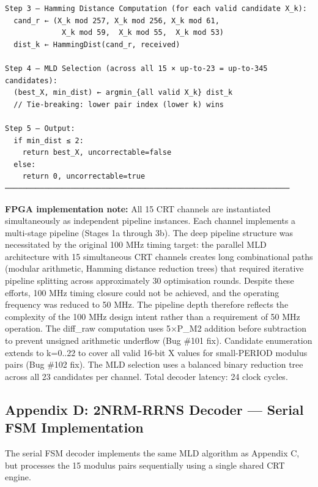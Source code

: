 \begin{verbatim}
Step 3 — Hamming Distance Computation (for each valid candidate X_k):
  cand_r ← (X_k mod 257, X_k mod 256, X_k mod 61,
             X_k mod 59,  X_k mod 55,  X_k mod 53)
  dist_k ← HammingDist(cand_r, received)

Step 4 — MLD Selection (across all 15 × up-to-23 = up-to-345 candidates):
  (best_X, min_dist) ← argmin_{all valid X_k} dist_k
  // Tie-breaking: lower pair index (lower k) wins

Step 5 — Output:
  if min_dist ≤ 2:
    return best_X, uncorrectable=false
  else:
    return 0, uncorrectable=true
─────────────────────────────────────────────────────────────────
\end{verbatim}

\textbf{FPGA implementation note:} All 15 CRT channels are instantiated
simultaneously as independent pipeline instances. Each channel
implements a multi-stage pipeline (Stages 1a through 3b). The deep
pipeline structure was necessitated by the original 100 MHz timing
target: the parallel MLD architecture with 15 simultaneous CRT channels
creates long combinational paths (modular arithmetic, Hamming distance
reduction trees) that required iterative pipeline splitting across
approximately 30 optimisation rounds. Despite these efforts, 100 MHz
timing closure could not be achieved, and the operating frequency was
reduced to 50 MHz. The pipeline depth therefore reflects the complexity
of the 100 MHz design intent rather than a requirement of 50 MHz
operation. The diff\_raw computation uses 5×P\_M2 addition before
subtraction to prevent unsigned arithmetic underflow (Bug \#101 fix).
Candidate enumeration extends to k=0..22 to cover all valid 16-bit X
values for small-PERIOD modulus pairs (Bug \#102 fix). The MLD selection
uses a balanced binary reduction tree across all 23 candidates per
channel. Total decoder latency: 24 clock cycles.

\subsection{Appendix D: 2NRM-RRNS Decoder --- Serial FSM
Implementation}\label{appendix-d-2nrm-rrns-decoder-serial-fsm-implementation}

The serial FSM decoder implements the same MLD algorithm as Appendix C,
but processes the 15 modulus pairs sequentially using a single shared
CRT engine.

